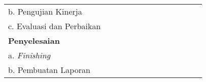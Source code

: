 \begin{longtable}{|l|cccccccccccc|}
b. Pengujian Kinerja                                   & \multicolumn{1}{c|}{}                         & \multicolumn{1}{c|}{}                         & \multicolumn{1}{c|}{}                         & \multicolumn{1}{c|}{}                         & \multicolumn{1}{c|}{}                         & \multicolumn{1}{c|}{}                         & \multicolumn{1}{c|}{\cellcolor[HTML]{333333}} & \multicolumn{1}{c|}{\cellcolor[HTML]{333333}} & \multicolumn{1}{c|}{}                         & \multicolumn{1}{c|}{}                         & \multicolumn{1}{c|}{}                         &                          \\
c. Evaluasi dan Perbaikan                              & \multicolumn{1}{c|}{}                         & \multicolumn{1}{c|}{}                         & \multicolumn{1}{c|}{}                         & \multicolumn{1}{c|}{}                         & \multicolumn{1}{c|}{}                         & \multicolumn{1}{c|}{}                         & \multicolumn{1}{c|}{\cellcolor[HTML]{333333}} & \multicolumn{1}{c|}{\cellcolor[HTML]{333333}} & \multicolumn{1}{c|}{\cellcolor[HTML]{333333}} & \multicolumn{1}{c|}{\cellcolor[HTML]{333333}} & \multicolumn{1}{c|}{\cellcolor[HTML]{333333}} &                          \\
\textbf{Penyelesaian}                                           & \multicolumn{1}{c|}{}                         & \multicolumn{1}{c|}{}                         & \multicolumn{1}{c|}{}                         & \multicolumn{1}{c|}{}                         & \multicolumn{1}{c|}{}                         & \multicolumn{1}{c|}{}                         & \multicolumn{1}{c|}{}                         & \multicolumn{1}{c|}{}                         & \multicolumn{1}{c|}{}                         & \multicolumn{1}{c|}{}                         & \multicolumn{1}{c|}{}                         &                          \\
a. \textit{Finishing}                                           & \multicolumn{1}{c|}{}                         & \multicolumn{1}{c|}{}                         & \multicolumn{1}{c|}{}                         & \multicolumn{1}{c|}{}                         & \multicolumn{1}{c|}{}                         & \multicolumn{1}{c|}{}                         & \multicolumn{1}{c|}{}                         & \multicolumn{1}{c|}{}                         & \multicolumn{1}{c|}{}                         & \multicolumn{1}{c|}{\cellcolor[HTML]{333333}} & \multicolumn{1}{c|}{\cellcolor[HTML]{333333}} &                          \\
b. Pembuatan Laporan                                   & \multicolumn{1}{c|}{}                         & \multicolumn{1}{c|}{}                         & \multicolumn{1}{c|}{}                         & \multicolumn{1}{c|}{}                         & \multicolumn{1}{c|}{}                         & \multicolumn{1}{c|}{}                         & \multicolumn{1}{c|}{}                         & \multicolumn{1}{c|}{}                         & \multicolumn{1}{c|}{}                         & \multicolumn{1}{c|}{}                         & \multicolumn{1}{c|}{\cellcolor[HTML]{333333}} & \cellcolor[HTML]{333333} \\ \hline

        \end{longtable}